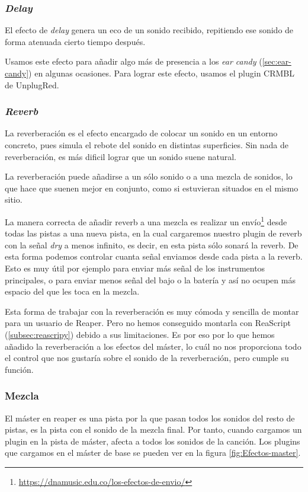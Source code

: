     \subsubsection{\textit{Delay}}\label{subsubsec:delay}
El efecto de \textit{delay} genera un eco de un sonido recibido, repitiendo ese sonido de forma atenuada cierto tiempo después. 

Usamos este efecto para añadir algo más de presencia a los \textit{ear candy} (\ref{sec:ear-candy}) en algunas ocasiones. Para lograr este efecto, usamos el plugin CRMBL de UnplugRed.

    \subsubsection{\textit{Reverb}}\label{subsubsec:reverb}
La reverberación es el efecto encargado de colocar un sonido en un entorno concreto, pues simula el rebote del sonido en distintas superficies. Sin nada de reverberación, es más dificil lograr que un sonido suene natural.

La reverberación puede añadirse a un sólo sonido o a una mezcla de sonidos, lo que hace que suenen mejor en conjunto, como si estuvieran situados en el mismo sitio.

La manera correcta de añadir reverb a una mezcla es realizar un envío\footnote{\url{https://dnamusic.edu.co/los-efectos-de-envio/}} desde todas las pistas a una nueva pista, en la cual cargaremos nuestro plugin de reverb con la señal \textit{dry} a menos infinito, es decir, en esta pista sólo sonará la reverb. De esta forma podemos controlar cuanta señal enviamos desde cada pista a la reverb. Esto es muy útil por ejemplo para enviar más señal de los instrumentos principales, o para enviar menos señal del bajo o la batería y así no ocupen más espacio del que les toca en la mezcla.

Esta forma de trabajar con la reverberación es muy cómoda y sencilla de montar para un usuario de Reaper. Pero no hemos conseguido montarla con ReaScript (\ref{subsec:reascripy}) debido a sus limitaciones. Es por eso por lo que hemos añadido la reverberación a los efectos del máster, lo cuál no nos proporciona todo el control que nos gustaría sobre el sonido de la reverberación, pero cumple su función.

    \subsubsection{Mezcla}
El máster en reaper es una pista por la que pasan todos los sonidos del resto de pistas, es la pista con el sonido de la mezcla final. Por tanto, cuando cargamos un plugin en la pista de máster, afecta a todos los sonidos de la canción. Los plugins que cargamos en el máster de base se pueden ver en la figura \ref{fig:Efectos-master}.
    
